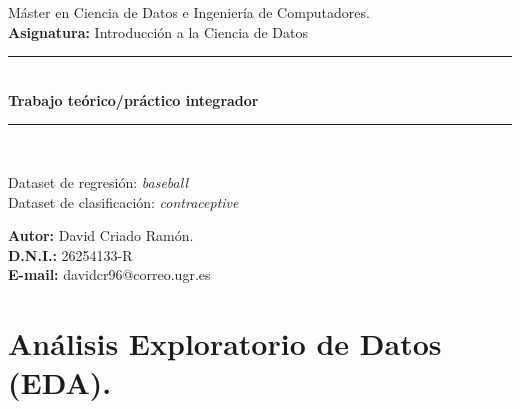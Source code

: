 \documentclass[a4paper,12pt, oneside]{book}
\begin{document}

\begin{titlepage}
\begin{center}

{\large Máster en Ciencia de Datos e Ingeniería de Computadores.}\\[0.5cm]

{\large \textbf{Asignatura: }Introducción a la Ciencia de Datos}\\[0.5cm]

\rule{\linewidth}{0.5mm} \\[0.4cm]
{ \huge \bfseries Trabajo teórico/práctico integrador\\[0.4cm] }
\rule{\linewidth}{0.5mm} \\[1.5cm]

\begin{flushright}
Dataset de regresión: \textit{baseball} \\
Dataset de clasificación: \textit{contraceptive} \\
\end{flushright}

\vfill
\begin{flushleft}
\textbf{Autor: } David Criado Ramón.\\
\textbf{D.N.I.: } 26254133-R \\
\textbf{E-mail: } davidcr96@correo.ugr.es \\
\end{flushleft}


\end{center}
\end{titlepage}


\frontmatter

\clearpage
\tableofcontents

\clearpage
\listoffigures

\clearpage


\mainmatter
\pagestyle{fancy}
\chapter{Análisis Exploratorio de Datos (EDA).}
\end{document}
